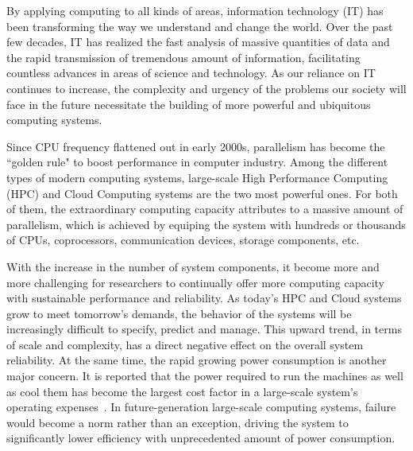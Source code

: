 By applying computing to all kinds of areas, information technology (IT) has been transforming the way we 
understand and change the world. Over the past few decades, IT has realized the fast analysis of massive 
quantities of data and the rapid transmission of tremendous amount of information, facilitating 
countless advances in areas of science and technology. 
As our reliance on IT continues to increase, the complexity and urgency of the problems our society will face 
in the future necessitate the building of more powerful and ubiquitous computing systems. 

Since CPU frequency flattened out in early 2000s, parallelism has become the ``golden rule" to boost performance 
in computer industry. Among the different types of modern computing systems, large-scale High Performance 
Computing (HPC) and Cloud Computing systems are the two most powerful ones. 
For both of them, the extraordinary computing capacity attributes to a massive amount of parallelism, which is achieved by 
equiping the system with hundreds or thousands of CPUs, coprocessors, communication devices, storage components, etc. 


With the increase in the number of system components, it become more and more challenging for 
researchers to continually offer more computing capacity with sustainable performance and reliability. 
As today's HPC and Cloud systems grow to 
meet tomorrow's demands, the behavior of the systems will be increasingly difficult to specify, predict and manage. 
This upward trend, in terms of scale and complexity, has a direct negative effect on the overall system reliability. 
At the same time, the rapid growing power consumption is another major concern. 
It is reported that 
the power required to run the machines as well as cool them has become the largest cost factor in a large-scale system's operating 
expenses~\cite{scaramella2014worldwide}.  
In future-generation large-scale computing systems, failure would become a norm rather than an exception, 
driving the system to significantly lower efficiency with unprecedented amount of power consumption. 

